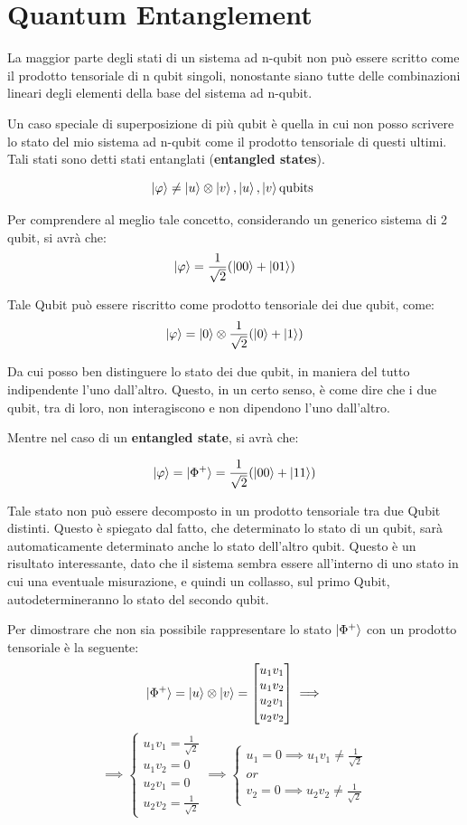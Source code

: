 \section{Quantum Entanglement}
La maggior parte degli stati di un sistema ad n-qubit non può essere scritto come il prodotto tensoriale di n qubit singoli, nonostante siano tutte delle combinazioni lineari degli elementi della base del sistema ad n-qubit.

Un caso speciale di superposizione di più qubit è quella in cui non posso scrivere lo stato del mio sistema ad n-qubit come il prodotto tensoriale di questi ultimi. Tali stati sono detti stati entanglati (\textbf{entangled states}).

\[
\ket{\varphi} \ne \ket{u} \otimes \ket{v}, \ket{u},\ket{v} \text{qubits
}
\]

Per comprendere al meglio tale concetto, considerando un generico sistema di 2 qubit, si avrà che:
\[
\ket{\varphi} = \frac{1}{\sqrt{2}}(\ket{00} + \ket{01})
\]

Tale Qubit può essere riscritto come prodotto tensoriale dei due qubit, come:
\[
\ket{\varphi} = \ket{0} \otimes \frac{1}{\sqrt{2}}(\ket{0} + \ket{1})
\]

Da cui posso ben distinguere lo stato dei due qubit, in maniera del tutto indipendente l'uno dall'altro. Questo, in un certo senso, è come dire che i due qubit, tra di loro, non interagiscono e non dipendono l'uno dall'altro.

Mentre nel caso di un \textbf{entangled state}, si avrà che:

\[
\ket{\varphi} = \ket{\Phi^+} = \frac{1}{\sqrt{2}}(\ket{00} + \ket{11})
\]

Tale stato non può essere decomposto in un prodotto tensoriale tra due Qubit distinti. Questo è spiegato dal fatto, che determinato lo stato di un qubit, sarà automaticamente determinato anche lo stato dell'altro qubit. Questo è un risultato interessante, dato che il sistema sembra essere all'interno di uno stato in cui una eventuale misurazione, e quindi un collasso, sul primo Qubit, autodetermineranno lo stato del secondo qubit. 

Per dimostrare che non sia possibile rappresentare lo stato \(\ket{\Phi^+}\) con un prodotto tensoriale è la seguente:
\[
\ket{\Phi^+} = \ket{u} \otimes \ket{v} = 
\begin{bmatrix}
u_1 v_1 \\
u_1 v_2 \\
u_2 v_1 \\
u_2 v_2
\end{bmatrix}
\implies
\]
\[
\implies
\begin{cases}
u_1 v_1 = \frac{1}{\sqrt{2}} \\
u_1 v_2 = 0 \\
u_2 v_1 = 0 \\
u_2 v_2 = \frac{1}{\sqrt{2}}
\end{cases}
\implies
\begin{cases}
u_1 = 0 \implies u_1 v_1 \ne \frac{1}{\sqrt{2}}\\
or \\
v_2 = 0 \implies u_2 v_2 \ne \frac{1}{\sqrt{2}}
\end{cases}
\]

